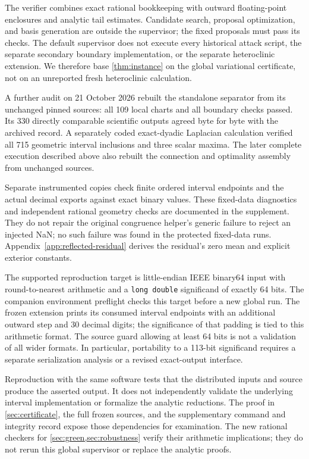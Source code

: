 The verifier combines exact rational bookkeeping with outward floating-point enclosures and analytic tail estimates. Candidate search, proposal optimization, and basis generation are outside the supervisor; the fixed proposals must pass its checks. The default supervisor does not execute every historical attack script, the separate secondary boundary implementation, or the separate heteroclinic extension. We therefore base \cref{thm:instance} on the global variational certificate, not on an unreported fresh heteroclinic calculation.

A further audit on 21 October 2026 rebuilt the standalone separator
from its unchanged pinned sources: all 109 local charts and all boundary
checks passed. Its 330 directly comparable scientific outputs agreed
byte for byte with the archived record. A separately coded exact-dyadic
Laplacian calculation verified all 715 geometric interval inclusions
and three scalar maxima. The later complete execution described above
also rebuilt the connection and optimality assembly from unchanged sources.

Separate instrumented copies check finite ordered interval endpoints and
the actual decimal exports against exact binary values. These fixed-data
diagnostics and independent rational geometry checks are documented in
the supplement. They do not repair the original congruence helper's
generic failure to reject an injected NaN; no such failure was found
in the protected fixed-data runs. Appendix~\ref{app:reflected-residual}
derives the residual's zero mean and explicit exterior constants.

The supported reproduction target is little-endian IEEE binary64 input
with round-to-nearest arithmetic and a \texttt{long double} significand
of exactly 64 bits. The companion environment preflight checks this
target before a new global run. The frozen extension prints its consumed
interval endpoints with an additional outward step and 30 decimal digits;
the significance of that padding is tied to this arithmetic format.
The source guard allowing at least 64 bits is not a validation of all wider
formats. In particular, portability to a 113-bit significand requires a
separate serialization analysis or a revised exact-output interface.

Reproduction with the same software tests that the distributed inputs and source produce the asserted output. It does not independently validate the underlying interval implementation or formalize the analytic reductions. The proof in \cref{sec:certificate}, the full frozen sources, and the supplementary command and integrity record expose those dependencies for examination. The new rational checkers for \cref{sec:green,sec:robustness} verify their arithmetic implications; they do not rerun this global supervisor or replace the analytic proofs.

